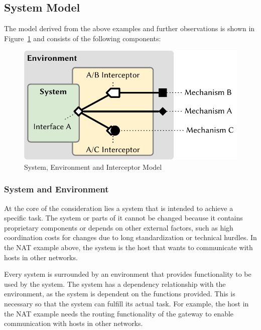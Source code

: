 \subsection{System Model}

The model derived from the above examples and further observations is shown in Figure~\ref{fig:bigpicture} and consists of the following components:
\begin{figure}
    \centering
    \includegraphics[width=.8\linewidth]{figures/MechanismMigration.pdf}
    \caption{System, Environment and Interceptor Model}
    \label{fig:bigpicture}
\end{figure}


\subsubsection{System and Environment}
At the core of the consideration lies a system that is intended to achieve a specific task.
The system or parts of it cannot be changed because it contains proprietary components or depends on other external factors, such as high coordination costs for changes due to long standardization or technical hurdles.
In the NAT example above, the system is the host that wants to communicate with hosts in other networks.

Every system is surrounded by an environment that provides functionality to be used by the system.
The system has a dependency relationship with the environment, as the system is dependent on the functions provided.
This is necessary so that the system can fulfill its actual task.
For example, the host in the NAT example needs the routing functionality of the gateway to enable communication with hosts in other networks.

